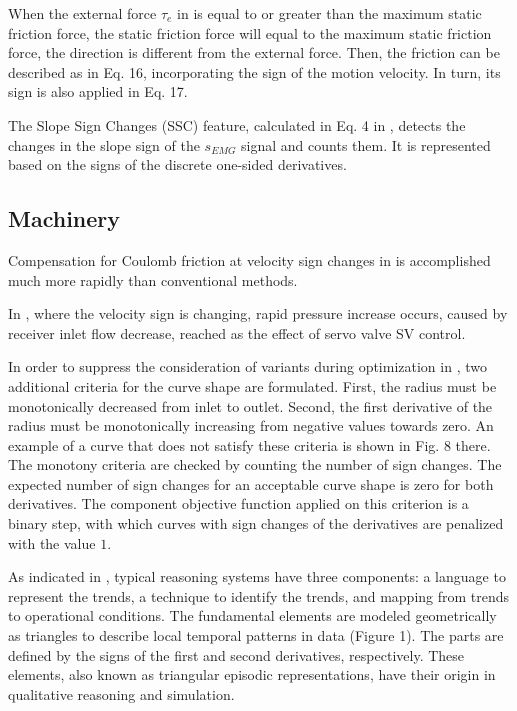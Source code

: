 \documentclass[11pt]{book}
\begin{document}
When the external force $\tau_{e}$ in \cite{chen2018universal} is
equal to or greater than the maximum static friction force, the static
friction force will equal to the maximum static friction force, the
direction is different from the external force. Then, the friction
can be described as in Eq. 16, incorporating the sign of the motion
velocity. In turn, its sign is also applied in Eq. 17.

The Slope Sign Changes (SSC) feature, calculated in Eq. 4 in \cite{hassan2020teleoperated},
detects the changes in the slope sign of the $s_{EMG}$ signal and
counts them. It is represented based on the signs of the discrete
one-sided derivatives.


\subsection{Machinery}

Compensation for Coulomb friction at velocity sign changes in \cite{iagnemma1997model}
is accomplished much more rapidly than conventional methods.

In \cite{korzeniowski2008investigation}, where the velocity sign
is changing, rapid pressure increase occurs, caused by receiver inlet
flow decrease, reached as the effect of servo valve SV control.

In order to suppress the consideration of variants during optimization
in \cite{tsalicoglou2010design}, two additional criteria for the
curve shape are formulated. First, the radius must be monotonically
decreased from inlet to outlet. Second, the first derivative of the
radius must be monotonically increasing from negative values towards
zero. An example of a curve that does not satisfy these criteria is
shown in Fig. 8 there. The monotony criteria are checked by counting
the number of sign changes. The expected number of sign changes for
an acceptable curve shape is zero for both derivatives. The component
objective function applied on this criterion is a binary step, with
which curves with sign changes of the derivatives are penalized with
the value $1$.

As indicated in \cite{juuso2011intelligent}, typical reasoning systems
have three components: a language to represent the trends, a technique
to identify the trends, and mapping from trends to operational conditions.
The fundamental elements are modeled geometrically as triangles to
describe local temporal patterns in data (Figure 1). The parts are
defined by the signs of the first and second derivatives, respectively.
These elements, also known as triangular episodic representations,
have their origin in qualitative reasoning and simulation.
\end{document}
